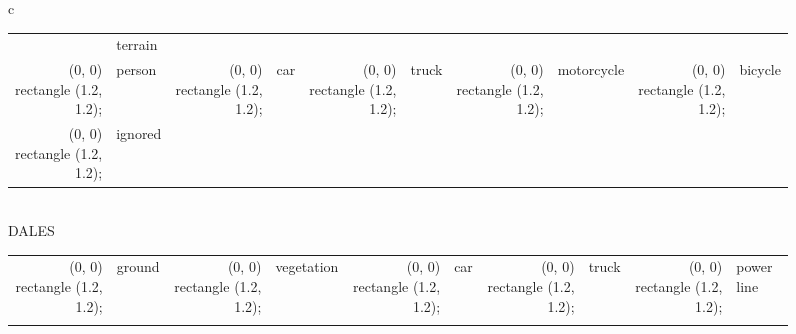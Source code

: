 \begin{figure*}[!b]
\begin{tabular}{c}
\begin{tabular}{rlrlrlrlrl}
            & \small{terrain} 
            \\
            \definecolor{tempcolor}{rgb}{0.86, 0.07, 0.23}
            \tikz \fill[fill=tempcolor, scale=0.3, draw=black] (0, 0) rectangle (1.2, 1.2);
            & \small{person} 
            &
            \definecolor{tempcolor}{rgb}{0.  , 0.  , 0.55}
            \tikz \fill[fill=tempcolor, scale=0.3, draw=black] (0, 0) rectangle (1.2, 1.2);
            & \small{car} 
            &
            \definecolor{tempcolor}{rgb}{0.  , 0.  , 0.27}
            \tikz \fill[fill=tempcolor, scale=0.3, draw=black] (0, 0) rectangle (1.2, 1.2);
            & \small{truck} 
            &
            \definecolor{tempcolor}{rgb}{0.  , 0.  , 0.90}
            \tikz \fill[fill=tempcolor, scale=0.3, draw=black] (0, 0) rectangle (1.2, 1.2);
            & \small{motorcycle} 
            &
            \definecolor{tempcolor}{rgb}{0.46, 0.04, 0.12}
            \tikz \fill[fill=tempcolor, scale=0.3, draw=black] (0, 0) rectangle (1.2, 1.2);
            & \small{bicycle} 
            \\
            \definecolor{tempcolor}{rgb}{0.  , 0.  , 0.  }
            \tikz \fill[fill=tempcolor, scale=0.3, draw=black] (0, 0) rectangle (1.2, 1.2);
            & \small{ignored} 
            &
        \end{tabular}\\
         \toprule
            \large{DALES}
        \\\midrule
        \begin{tabular}{rlrlrlrlrl}
            \definecolor{tempcolor}{rgb}{0.95, 0.84, 0.67}
            \tikz \fill[fill=tempcolor, scale=0.3, draw=black] (0, 0) rectangle (1.2, 1.2);
            & \small{ground} 
            &
            \definecolor{tempcolor}{rgb}{0.27, 0.45, 0.26}
            \tikz \fill[fill=tempcolor, scale=0.3, draw=black] (0, 0) rectangle (1.2, 1.2); 
            & \small{vegetation}
            &
            \definecolor{tempcolor}{rgb}{0.91, 0.20, 0.94}
            \tikz \fill[fill=tempcolor, scale=0.3, draw=black] (0, 0) rectangle (1.2, 1.2); 
            & \small{car}
            &
            \definecolor{tempcolor}{rgb}{0.95, 0.93, 0.}
            \tikz \fill[fill=tempcolor, scale=0.3, draw=black] (0, 0) rectangle (1.2, 1.2);
            & \small{truck} &
            \definecolor{tempcolor}{rgb}{0.75, 0.6,0.6  }
            \tikz \fill[fill=tempcolor, scale=0.3, draw=black] (0, 0) rectangle (1.2, 1.2);
            & \small{power line} 
            \\
            \definecolor{tempcolor}{rgb}{0., 0.91,  0.04}

\end{tabular}
\end{tabular}
\end{figure*}
